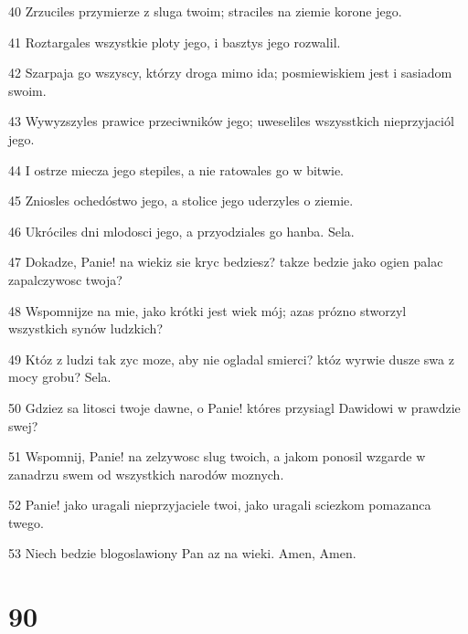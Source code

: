 \par 40 Zrzuciles przymierze z sluga twoim; straciles na ziemie korone jego.
\par 41 Roztargales wszystkie ploty jego, i basztys jego rozwalil.
\par 42 Szarpaja go wszyscy, którzy droga mimo ida; posmiewiskiem jest i sasiadom swoim.
\par 43 Wywyzszyles prawice przeciwników jego; uweseliles wszysstkich nieprzyjaciól jego.
\par 44 I ostrze miecza jego stepiles, a nie ratowales go w bitwie.
\par 45 Zniosles ochedóstwo jego, a stolice jego uderzyles o ziemie.
\par 46 Ukróciles dni mlodosci jego, a przyodziales go hanba. Sela.
\par 47 Dokadze, Panie! na wiekiz sie kryc bedziesz? takze bedzie jako ogien palac zapalczywosc twoja?
\par 48 Wspomnijze na mie, jako krótki jest wiek mój; azas prózno stworzyl wszystkich synów ludzkich?
\par 49 Któz z ludzi tak zyc moze, aby nie ogladal smierci? któz wyrwie dusze swa z mocy grobu? Sela.
\par 50 Gdziez sa litosci twoje dawne, o Panie! któres przysiagl Dawidowi w prawdzie swej?
\par 51 Wspomnij, Panie! na zelzywosc slug twoich, a jakom ponosil wzgarde w zanadrzu swem od wszystkich narodów moznych.
\par 52 Panie! jako uragali nieprzyjaciele twoi, jako uragali sciezkom pomazanca twego.
\par 53 Niech bedzie blogoslawiony Pan az na wieki. Amen, Amen.

\chapter{90}

